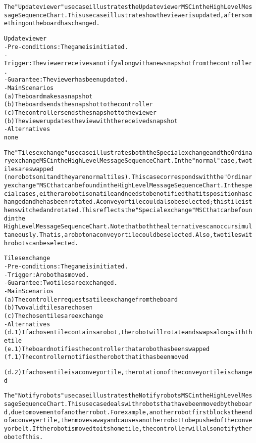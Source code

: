 \begin{alltt}
The "Update viewer" use case illustrates the Update viewer MSC in the High Level Message Sequence Chart. This use case illustrates how the viewer is updated, after something on the board has changed.

Update viewer
- Pre-conditions: The game is initiated.
- Trigger: The viewer receives a notify along with a new snapshot from the controller.
- Guarantee: The viewer has been updated.
- Main Scenarios
    (a) The board makes a snapshot
    (b) The board sends the snapshot to the controller
    (c) The controller sends the snapshot to the viewer
    (b) The viewer updates the view with the received snapshot
- Alternatives
    none

The "Tiles exchange" use case illustrates both the Special exchange and the Ordinary exchange MSC in the High Level Message Sequence Chart. In the "normal" case, two tiles are swapped
(no robots on it and they are normal tiles). This case corresponds with the "Ordinary exchange" MSC that can be found in the High Level Message Sequence Chart. In the special cases, either a robot is on a tile and needs to be notified that its position has changed and he has been rotated. A conveyor tile could also be selected; this tile is then switched and rotated. This reflects the "Special exchange" MSC that can be found in the
High Level Message Sequence Chart. Note that both the alternatives can occur simultaneously. That is, a robot on a conveyor tile could be selected. Also, two tiles with robots can be selected.

Tiles exchange
- Pre-conditions: The game is initiated.
- Trigger:  A robot has moved.
- Guarantee: Two tiles are exchanged.
- Main Scenarios
    (a) The controller requests a tile exchange from the board
    (b) Two valid tiles are chosen
    (c) The chosen tiles are exchange
- Alternatives
    (d.1) If a chosen tile contains a robot, the robot will rotate and swaps along with the tile
    (e.1) The board notifies the controller that a robot has been swapped
    (f.1) The controller notifies the robot that it has been moved

    (d.2) If a chosen tile is a conveyor tile, the rotation of the conveyor tile is changed

The "Notify robots" use case illustrates the Notify robots MSC in the High Level Message Sequence Chart. This use case deals with robots that have been moved by the board, due to movement of another robot. For example, another robot first blocks the end of a conveyer tile, then moves away and causes another robot to be pushed of the conveyor belt. If the robot is moved to its home tile, the controller will also notify the robot of this.\\


\end{alltt}
